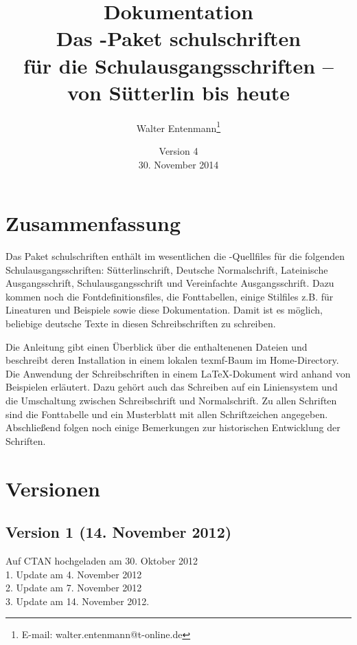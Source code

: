\documentclass[12pt,titlepage]{article}
\begin{document}
\renewcommand{\figurename}{Bild}

\title{{\huge\bfseries Dokumentation}\\[5mm]
Das \MF-Paket {\sffamily\bfseries schulschriften}\\
f\"ur die Schulausgangsschriften --\\
 von S\"utterlin bis heute}
\author{Walter Entenmann\thanks{E-mail: walter.entenmann@t-online.de}}
\date{Version 4\\30. November 2014}
\maketitle

\newpage
\section*{Zusammenfassung}
Das Paket {\sffamily schulschriften}   enth\"alt  im wesentlichen 
die \MF-Quellfiles
f\"ur die folgenden Schulausgangsschriften:
S\"utterlinschrift, Deutsche Normalschrift, 
Lateinische Ausgangsschrift, Schulausgangsschrift und 
Vereinfachte Ausgangsschrift. Dazu kommen noch
die Fontdefinitionsfiles, die Fonttabellen, 
einige Stilfiles z.B. f\"ur Lineaturen und
Beispiele sowie diese Dokumentation. 
Damit ist es m\"oglich, beliebige deutsche Texte in diesen
Schreibschriften zu schreiben.

Die Anleitung gibt  einen \"Uberblick \"uber die enthaltenenen Dateien
und beschreibt deren Installation in einem lokalen texmf-Baum im
Home-Directory.
Die Anwendung der Schreibschriften in einem \LaTeX-Dokument wird
anhand von Beispielen erl\"autert. 
Dazu geh\"ort auch das Schreiben auf ein Liniensystem und die
Umschaltung zwischen Schreibschrift und Normalschrift.
Zu allen Schriften sind die Fonttabelle und ein
Musterblatt mit allen Schriftzeichen angegeben.
Abschlie\ss{}end folgen noch  einige Bemerkungen zur historischen  Entwicklung
der Schriften.

\section{Versionen}
\subsection{Version 1 (14. November 2012)}
Auf CTAN hochgeladen am 30. Oktober 2012\\
1. Update am 4. November 2012\\
2. Update am 7. November 2012\\
3. Update am 14. November 2012.
\end{document}
